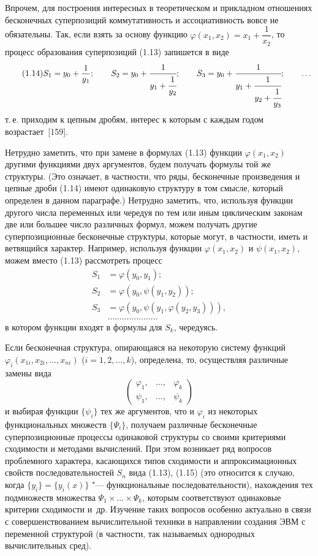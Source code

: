 Впрочем, для построения интересных в теоретическом и прикладном
отношениях бесконечных суперпозиций коммутативность и ассоциативность
вовсе не обязательны. Так, если взять за основу функцию
$\varphi(x_1,x_2)=x_1+\dfrac1{x_2}$, то процесс образования суперпозиций
(1.13) запишется в виде
\begin{equation}\tag{1.14}
S_1=y_0+\frac1{y_1};\qquad
S_2=y_0+\cfrac1{y_1+\cfrac1{y_2}};\qquad
S_3=y_0+\cfrac1{y_1+\cfrac1{y_2+\cfrac1{y_3}}};\qquad\dots
\end{equation}
%
т.\,е. приходим к цепным дробям, интерес к которым с каждым годом
возрастает~[159].

Нетрудно заметить, что при замене в формулах (1.13) функции
$\varphi(x_1,x_2)$ другими функциями двух аргументов, будем получать
формулы той же структуры. (Это означает, в частности, что ряды,
бесконечные произведения и цепные дроби (1.14) имеют одинаковую структуру
в том смысле, который определен в данном параграфе.) Нетрудно заметить,
что, используя функции другого числа переменных или чередуя по тем или
иным циклическим законам две или большее число различных формул, можем
получать другие суперпозиционные бесконечные структуры, которые могут,
в частности, иметь и ветвящийся характер. Например, используя функции
$\varphi(x_1,x_2)$ и $\psi(x_1,x_2)$, можем вместо (1.13) рассмотреть
процесс
\begin{equation}\tag{1.15}
\begin{aligned}
S_1&=\varphi(y_0,y_1);\\
S_2&=\varphi(y_0,\psi(y_1,y_2));\\
S_3&=\varphi(y_0,\psi(y_1,\varphi(y_2,y_3))),\\
&\dots\dots\dots\dots\dots\dots\dots
\end{aligned}
\end{equation}
в котором функции входят в формулы для $S_k$, чередуясь.

Если бесконечная структура, опирающаяся на некоторую систему функций
$\varphi_i(x_{1i},x_{2i},\dots,x_{ni})$ ($i=1,2,\dots,k$), определена, то,
осуществляя различные замены вида
\[
\begin{pmatrix}\varphi_1,&\dots,&\varphi_k\\ \psi_1,&\dots,&\psi_k\end{pmatrix}
\]
и выбирая функции $\{\psi_i\}$ тех же аргументов, что и $\varphi_i$ из
некоторых функциональных множеств $\{\Psi_i\}$, получаем различные
бесконечные суперпозиционные процессы одинаковой структуры со своими
критериями сходимости и методами вычислений. При этом возникает ряд
вопросов проблемного характера, касающихся типов сходимости
и аппроксимационных свойств последовательностей $S_n$ вида (1.13), (1.15)
(это относится к случаю, когда $\{y_i\}=\{y_i(x)\}$ "--- функциональные
последовательности), нахождения тех подмножеств множества
$\Psi_1\times\dots\times\Psi_k$, которым соответствуют одинаковые критерии
сходимости и~др. Изучение таких вопросов особенно актуально в связи
с совершенствованием вычислительной техники в направлении создания ЭВМ
с переменной структурой (в частности, так называемых однородных
вычислительных сред).

